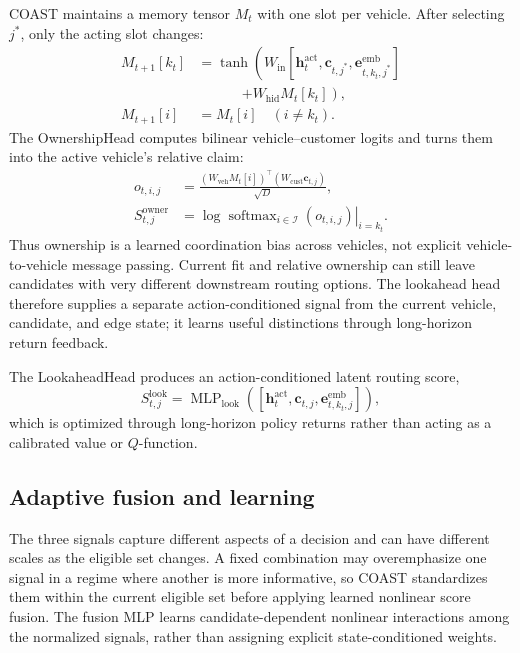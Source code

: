 \documentclass[letterpaper]{article}
\begin{document}
COAST maintains a memory tensor $M_t$ with one slot per vehicle. After selecting $j^*$, only the acting slot changes:
\[
\begin{aligned}
M_{t+1}[k_t]&=\tanh\!\left(W_{\mathrm{in}}[\mathbf h_t^{\mathrm{act}},\mathbf c_{t,j^*},
\mathbf e_{t,k_t,j^*}^{\mathrm{emb}}]\right.\\[-2pt]
&\hspace{38pt}\left.+W_{\mathrm{hid}}M_t[k_t]\right),\\
M_{t+1}[i]&=M_t[i]\quad(i\ne k_t).
\end{aligned}
\]
The OwnershipHead computes bilinear vehicle--customer logits and turns them into the active vehicle's relative claim:
\[
\begin{aligned}
o_{t,i,j}&=\frac{(W_{\mathrm{veh}}M_t[i])^\top(W_{\mathrm{cust}}\mathbf c_{t,j})}{\sqrt D},\\
S_{t,j}^{\mathrm{owner}}&=
\left.\log\operatorname{softmax}_{i\in\mathcal I}(o_{t,i,j})\right|_{i=k_t}.
\end{aligned}
\]
Thus ownership is a learned coordination bias across vehicles, not explicit vehicle-to-vehicle message passing. Current fit and relative ownership can still leave candidates with very different downstream routing options. The lookahead head therefore supplies a separate action-conditioned signal from the current vehicle, candidate, and edge state; it learns useful distinctions through long-horizon return feedback.

The LookaheadHead produces an action-conditioned latent routing score,
\[
S_{t,j}^{\mathrm{look}}=\operatorname{MLP}_{\mathrm{look}}
([\mathbf h_t^{\mathrm{act}},\mathbf c_{t,j},\mathbf e_{t,k_t,j}^{\mathrm{emb}}]),
\]
which is optimized through long-horizon policy returns rather than acting as a calibrated value or $Q$-function.

\subsection{Adaptive fusion and learning}

The three signals capture different aspects of a decision and can have different scales as the eligible set changes. A fixed combination may overemphasize one signal in a regime where another is more informative, so COAST standardizes them within the current eligible set before applying learned nonlinear score fusion. The fusion MLP learns candidate-dependent nonlinear interactions among the normalized signals, rather than assigning explicit state-conditioned weights.
\end{document}

